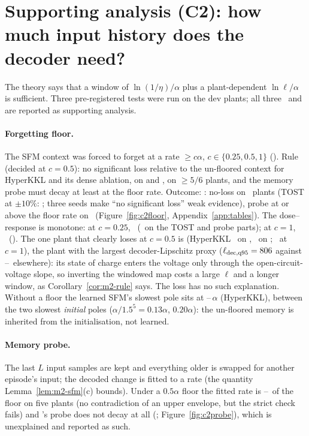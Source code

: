 \section{Supporting analysis (C2): how much input history does the decoder need?}\label{sec:c2}

The theory says that a window of $\ln(1/\eta)/\alpha$ plus a plant-dependent $\ln\ell/\alpha$ is sufficient. Three pre-registered tests were run on the dev plants; all three \FAIL\ and are reported as supporting analysis.

\paragraph{Forgetting floor.} The SFM context was forced to forget at a rate $\ge c\alpha$, $c\in\{0.25,0.5,1\}$ (). Rule (decided at $c=0.5$): no significant loss relative to the un-floored context for HyperKKL and its dense ablation, on  and , on $\ge5/6$ plants, and the memory probe must decay at least at the floor rate. Outcome: \OutcomeCTwoFloorFive: no-loss on \CtwoFloorFiveNoLoss\ plants (TOST at $\pm10\%$: \CtwoFloorFiveTostNonInferior; three seeds make ``no significant loss'' weak evidence), probe at or above the floor rate on \CtwoFloorFiveProbeAboveFloor\ (Figure~\ref{fig:c2floor}, Appendix~\ref{app:tables}). The dose--response is monotone: at $c=0.25$, \CtwoFloorTwentyFiveNoLoss\ (\OutcomeCTwoFloorTwentyFive\ on the TOST and probe parts); at $c=1$, \CtwoFloorOneNoLoss\ (\OutcomeCTwoFloorOne). The one plant that clearly loses at $c=0.5$ is  (HyperKKL \CtwoFloorFiveBatteryLoraId\ on , \CtwoFloorFiveBatteryLoraSeq\ on ; \CtwoFloorOneBatteryLoraId\ at $c=1$), the plant with the largest decoder-Lipschitz proxy ($\ell_{\rm dec,q95}=806$ against \CtwoLdecQLorenz--\CtwoLdecQDuffing\ elsewhere): its state of charge enters the voltage only through the open-circuit-voltage slope, so inverting the windowed map costs a large $\ell$ and a longer window, as Corollary~\ref{cor:m2-rule} says. The  loss has no such explanation. Without a floor the learned SFM's slowest pole sits at \CtwoSfmPoleOverAlphaDuffingLora--\CtwoSfmPoleOverAlphaBatteryLora\,$\alpha$ (HyperKKL), between the two slowest \emph{initial} poles ($\alpha/1.5^5=0.13\alpha$, $0.20\alpha$): the un-floored memory is inherited from the initialisation, not learned.

\paragraph{Memory probe.} The last $L$ input samples are kept and everything older is swapped for another episode's input; the decoded change is fitted to a rate (the quantity Lemma~\ref{lem:m2-sfm}(c) bounds). Under a $0.5\alpha$ floor the fitted rate is \CtwoFloorFiveProbeRatioDuffing--\CtwoFloorFiveProbeRatioQuadTank\ of the floor on five plants (no contradiction of an upper envelope, but the strict check fails) and 's probe does not decay at all (\CtwoFloorFiveProbeRatioLorenz; Figure~\ref{fig:c2probe}), which is unexplained and reported as such.

